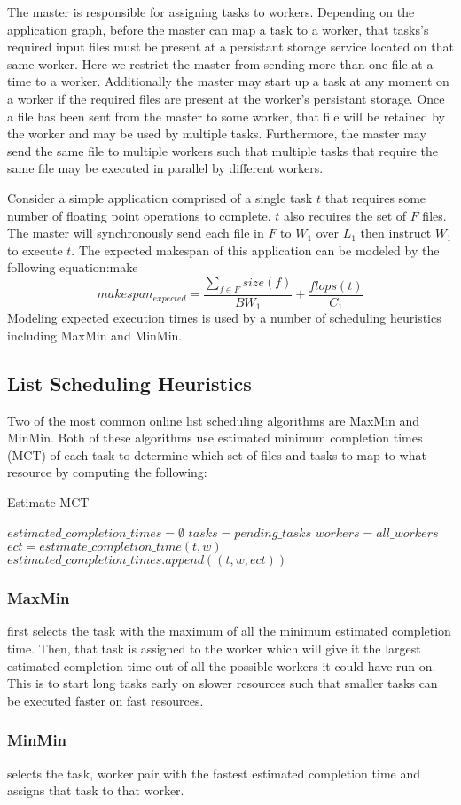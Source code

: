 The master is responsible for assigning tasks to workers. Depending
on the application graph, before the master can map a task to a worker,
that tasks's required input files must be present at a persistant storage
service located on that same worker. Here we restrict the master from
sending more than one file at a time to a worker. Additionally the master
may start up a task at any moment on a worker if the required files are present
at the worker's persistant storage. Once a file has been sent from the master
to some worker, that file will be retained by the worker and may be used by
multiple tasks. Furthermore, the master may send the same file to multiple
workers such that multiple tasks that require the same file may be executed
in parallel by different workers.

Consider a simple application comprised of a single task $t$ that requires
some number of floating point operations to complete. $t$ also requires the set
of $F$ files. The master will synchronously send each file in $F$ to $W_1$
over $L_1$ then instruct $W_1$ to execute $t$. The expected makespan of this
application can be modeled by the following equation:make
$$ makespan_{expected} = \frac{\sum\limits_{f \in F}size(f)}{BW_1} + \frac{flops(t)} {C_1} $$
Modeling expected execution times is used by a number of scheduling heuristics
including MaxMin and MinMin.

\subsection{List Scheduling Heuristics}

Two of the most common online list scheduling algorithms are MaxMin and MinMin.
Both of these algorithms use estimated minimum completion times (MCT) of each
task to determine which set of files and tasks to map to what resource by
computing the following:

\begin{algorithm}[H]
  \caption{Estimate MCT}
  \begin{algorithmic}
    \STATE $estimated\_completion\_times = \emptyset$
    \STATE $tasks = pending\_tasks$
    \STATE $workers = all\_workers$
        \STATE $ect = estimate\_completion\_time(t, w)$
        \STATE $estimated\_completion\_times.append((t, w, ect))$
      \ENDFOR
    \ENDFOR
  \end{algorithmic}
\end{algorithm}

\subsubsection{MaxMin}
first selects the task with the maximum of all the minimum estimated completion time.
Then, that task is assigned to the worker which will give it the largest estimated
completion
time out of all the possible workers it could have run on. This is to start long
tasks early on slower resources such that smaller tasks can be executed faster
on fast resources.

\subsubsection{MinMin}
selects the task, worker pair with the fastest estimated completion time and
assigns that task to that worker.
